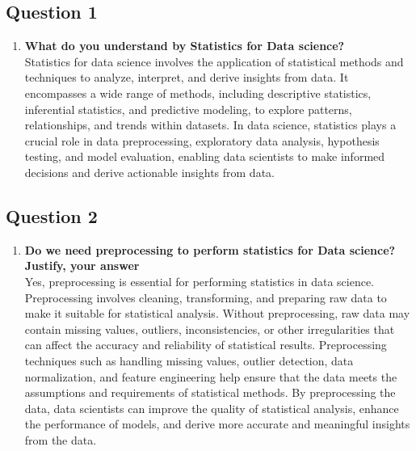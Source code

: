 \documentclass[11pt]{article}
\begin{document}
\subsection{Question 1}
\begin{enumerate}
    \item \textbf{What do you understand by Statistics for Data science?}\\
          Statistics for data science involves the application of statistical methods and techniques to analyze, interpret, and derive insights from data. It encompasses a wide range of methods, including descriptive statistics, inferential statistics, and predictive modeling, to explore patterns, relationships, and trends within datasets. In data science, statistics plays a crucial role in data preprocessing, exploratory data analysis, hypothesis testing, and model evaluation, enabling data scientists to make informed decisions and derive actionable insights from data.

\end{enumerate}

\subsection{Question 2}
\begin{enumerate}
    \item \textbf{Do we need preprocessing to perform statistics for Data science? Justify, your answer}\\
          Yes, preprocessing is essential for performing statistics in data science. Preprocessing involves cleaning, transforming, and preparing raw data to make it suitable for statistical analysis. Without preprocessing, raw data may contain missing values, outliers, inconsistencies, or other irregularities that can affect the accuracy and reliability of statistical results. Preprocessing techniques such as handling missing values, outlier detection, data normalization, and feature engineering help ensure that the data meets the assumptions and requirements of statistical methods. By preprocessing the data, data scientists can improve the quality of statistical analysis, enhance the performance of models, and derive more accurate and meaningful insights from the data.
\end{enumerate}
\end{document}
